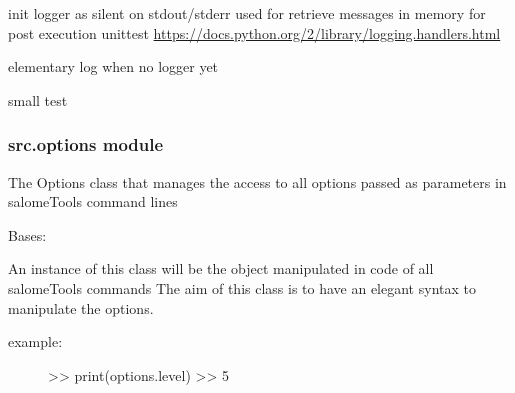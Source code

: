 \documentclass[a4paper,10pt,english]{sphinxmanual}
\begin{document}

\begin{fulllineitems}
\label{commands/apidoc/src:src.loggingSat.initLoggerAsUnittest}
init logger as silent on stdout/stderr
used for retrieve messages in memory for post execution unittest
\url{https://docs.python.org/2/library/logging.handlers.html}

\end{fulllineitems}


\begin{fulllineitems}
\label{commands/apidoc/src:src.loggingSat.log}
elementary log when no logger yet

\end{fulllineitems}


\begin{fulllineitems}
\label{commands/apidoc/src:src.loggingSat.testLogger_1}
small test

\end{fulllineitems}



\subsubsection{src.options module}
\label{commands/apidoc/src:module-src.options}\label{commands/apidoc/src:src-options-module}
The Options class that manages the access to all options passed as 
parameters in salomeTools command lines

\begin{fulllineitems}
\label{commands/apidoc/src:src.options.OptResult}
Bases: 

An instance of this class will be the object manipulated
in code of all salomeTools commands
The aim of this class is to have an elegant syntax to manipulate the options.
\begin{description}
\item[{example: }] \leavevmode
\textgreater{}\textgreater{} print(options.level)
\textgreater{}\textgreater{} 5

\end{description}

\end{fulllineitems}
\end{document}
